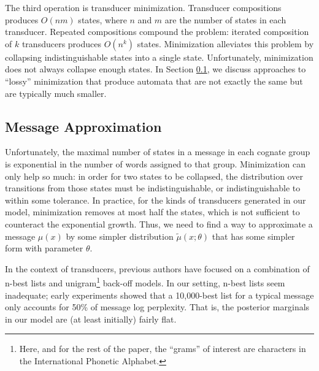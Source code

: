 \documentclass[11pt,a4paper]{article}
\begin{document}
The third operation is transducer minimization. Transducer compositions
produces $O(nm)$ states, where $n$ and $m$ are the number of states
in each transducer. Repeated compositions compound the problem:
iterated composition of $k$ transducers produces $O(n^k)$ states.
Minimization alleviates this problem by collapsing indistinguishable
states into a single state. Unfortunately, minimization does not
always collapse enough states. In Section \ref{sec:approx}, we discuss approaches
to ``lossy'' minimization that produce automata that are not exactly
the same but are typically much smaller.

\subsection{Message Approximation}
\label{sec:approx}

Unfortunately, the maximal number of states in a message in each
cognate group is exponential in the number of words assigned to
that group. Minimization can only help so much: in order for two
states to be collapsed, the distribution over transitions from those
states must be indistinguishable, or indistinguishable to within
some tolerance. In practice, for the kinds of transducers generated
in our model, minimization removes at most half the states, which
is not sufficient to counteract the exponential growth. Thus, we
need to find a way to approximate a message $\mu(x)$ by some simpler
distribution $\tilde\mu(x;\theta)$ that has some simpler form with
parameter $\theta$.

In the context of transducers, previous authors have focused on a
combination of n-best lists and unigram\footnote{Here, and for the
rest of the paper, the ``grams'' of interest are characters in the
International Phonetic Alphabet.} back-off models. \cite{dreyer2009graphical}
In our setting, n-best lists seem inadequate; early experiments
showed that a 10,000-best list for a typical message only accounts
for 50\% of message log perplexity. That is, the posterior marginals in
our model are (at least initially) fairly flat.
\end{document}
